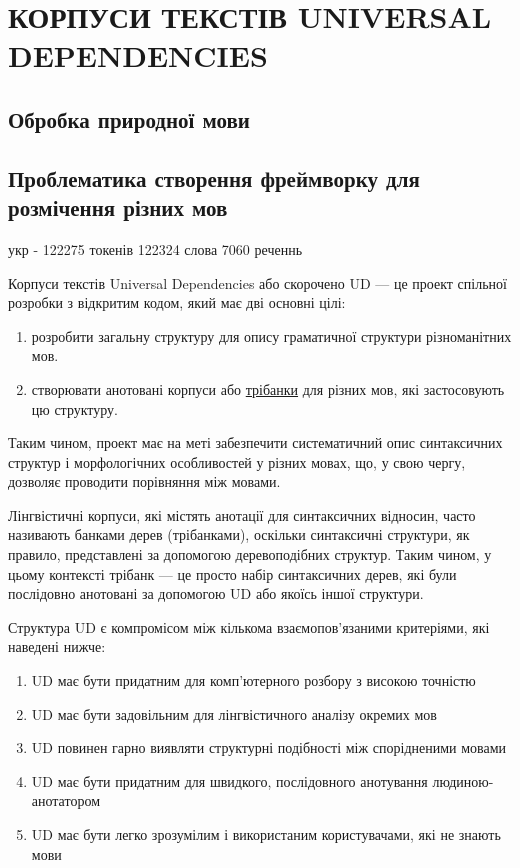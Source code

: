 \section{КОРПУСИ ТЕКСТІВ UNIVERSAL DEPENDENCIES}


\subsection{Обробка природної мови}

\subsection{Проблематика створення фреймворку для розмічення різних мов}

укр - 122275 токенів 122324 слова 7060 реченнь

Корпуси текстів Universal Dependencies або скорочено UD — це проект спільної розробки
з відкритим кодом, який має дві основні цілі:

\begin{enumerate}
    \item розробити загальну структуру для опису граматичної структури різноманітних мов.
    \cite{bib1}
    \item створювати анотовані корпуси або \hyperlink{term0}{трібанки} для різних мов,
    які застосовують цю структуру. \cite{bib2}
\end{enumerate}

Таким чином, проект має на меті забезпечити систематичний опис синтаксичних структур і
морфологічних особливостей у різних мовах, що, у свою чергу, дозволяє проводити порівняння
між мовами.

Лінгвістичні корпуси, які містять анотації для синтаксичних відносин,
часто називають банками дерев (трібанками), оскільки синтаксичні структури, як правило,
представлені за допомогою деревоподібних структур. Таким чином, у цьому контексті трібанк —
це просто набір синтаксичних дерев, які були послідовно анотовані за допомогою UD
або якоїсь іншої структури.

Структура UD є компромісом між кількома взаємопов'язаними критеріями, які наведені нижче:

\begin{enumerate}
    \item UD має бути придатним для комп'ютерного розбору з високою точністю
    \item UD має бути задовільним для лінгвістичного аналізу окремих мов
    \item UD повинен гарно виявляти структурні подібності між спорідненими мовами
    \item UD має бути придатним для швидкого, послідовного анотування людиною-анотатором
    \item UD має бути легко зрозумілим і використаним користувачами, які не знають мови
\end{enumerate}

